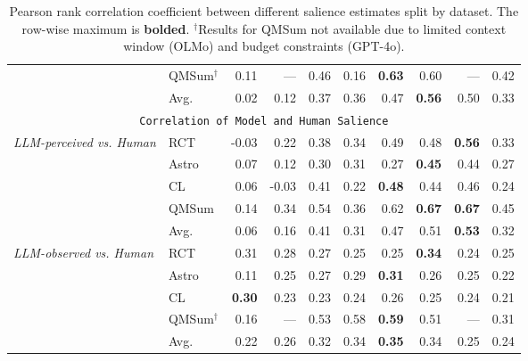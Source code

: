 \begin{table*}[t]
\begin{tabular}{llrrrrrrrr}
\bfseries  & QMSum$^\dagger$ & 0.11 & --- & 0.46 & 0.16 & \bfseries 0.63 & 0.60 & --- & 0.42 \\\cmidrule{2-10}
\bfseries  & Avg. & 0.02 & 0.12 & 0.37 & 0.36 & 0.47 & \bfseries 0.56 & 0.50 & 0.33 \\\midrule
\multicolumn{10}{c}{\texttt{Correlation of Model and Human Salience}} \\\midrule
\multirow[c]{5}{0.14\textwidth}{\emph{LLM-perceived vs. Human}} & RCT & -0.03 & 0.22 & 0.38 & 0.34 & 0.49 & 0.48 & \bfseries 0.56 & 0.33 \\
\bfseries  & Astro & 0.07 & 0.12 & 0.30 & 0.31 & 0.27 & \bfseries 0.45 & 0.44 & 0.27 \\
\bfseries  & CL & 0.06 & -0.03 & 0.41 & 0.22 & \bfseries 0.48 & 0.44 & 0.46 & 0.24 \\
\bfseries  & QMSum & 0.14 & 0.34 & 0.54 & 0.36 & 0.62 & \bfseries 0.67 & \bfseries 0.67 & 0.45 \\\cmidrule{2-10}
\bfseries  & Avg. & 0.06 & 0.16 & 0.41 & 0.31 & 0.47 & 0.51 & \bfseries 0.53 & 0.32 \\\midrule
\multirow[c]{5}{0.14\textwidth}{\emph{LLM-observed vs. Human}} & RCT & 0.31 & 0.28 & 0.27 & 0.25 & 0.25 & \bfseries 0.34 & 0.24 & 0.25 \\
\bfseries  & Astro & 0.11 & 0.25 & 0.27 & 0.29 & \bfseries 0.31 & 0.26 & 0.25 & 0.22 \\
\bfseries  & CL & \bfseries 0.30 & 0.23 & 0.23 & 0.24 & 0.26 & 0.25 & 0.24 & 0.21 \\
\bfseries  & QMSum$^\dagger$ & 0.16 & --- & 0.53 & 0.58 & \bfseries 0.59 & 0.51 & --- & 0.31 \\\cmidrule{2-10}
\bfseries  & Avg. & 0.22 & 0.26 & 0.32 & 0.34 & \bfseries 0.35 & 0.34 & 0.25 & 0.24 \\
\bottomrule
\end{tabular}
\caption{Pearson rank correlation coefficient between different salience estimates split by dataset.
The row-wise maximum is \textbf{bolded}. $^\dagger$Results for QMSum not available due to limited context window (OLMo) and budget constraints (GPT-4o).}
\label{tab:results-rater-agreement-full}
\end{table*}
